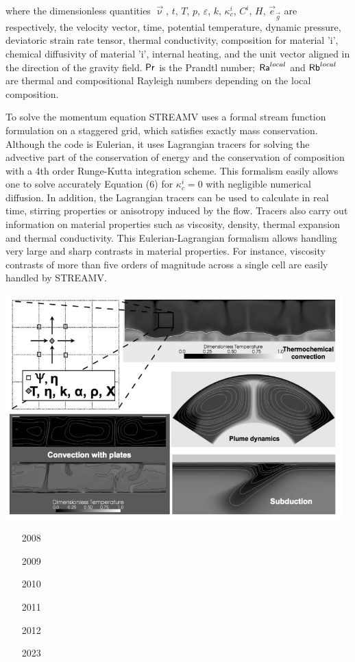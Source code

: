 where the dimensionless quantities $\vec\upnu$, $t$, $T$, $p$, 
$\varepsilon$, $k$, $\kappa_c^i$, $C^i$, $H$, $\vec{e}_{\vec g}$ 
are respectively, the velocity
vector, time, potential temperature, dynamic pressure, deviatoric strain rate tensor, thermal
conductivity, composition for material 'i', chemical diffusivity of material 'i', internal
heating, and the unit vector aligned in the direction of the gravity field. ${\mathsf{Pr}}$ 
is the Prandtl number;
${\mathsf{Ra}}^{local}$ and ${\mathsf{Rb}}^{local}$ are thermal and compositional Rayleigh numbers 
depending on the local composition.

To solve the momentum equation STREAMV uses a formal stream function formulation on
a staggered grid, which satisfies exactly mass conservation. Although the
code is Eulerian, it uses Lagrangian tracers for solving the advective part of the conservation
of energy and the conservation of composition with a 4th order Runge-Kutta integration
scheme. This formalism easily allows one to solve accurately Equation (6) for $\kappa_c^i=0$ with
negligible numerical diffusion. In addition, the Lagrangian tracers can be used to calculate in
real time, stirring properties or anisotropy induced by the flow. Tracers also carry out
information on material properties such as viscosity, density, thermal expansion and thermal
conductivity. This Eulerian-Lagrangian formalism allows handling very large and sharp
contrasts in material properties. For instance, viscosity contrasts of more than five orders of
magnitude across a single cell are easily handled by STREAMV.

\includegraphics[width=13cm]{images/codes/streamV}

\begin{small}
\begin{itemize}
\item[2008]
\textcite{samu08} 
\item[2009]
\textcite{samu09} 
\item[2010]
\textcite{saev10}
\item[2011]
\textcite{saad11}
\item[2012]
\textcite{samu12b}
\item[2023]
\textcite{sasa23}
\end{itemize}
\end{small}

